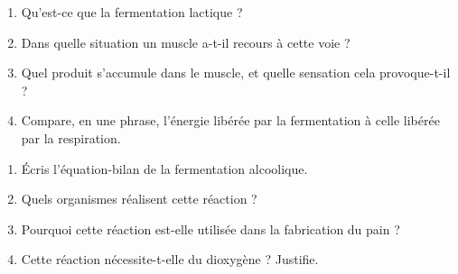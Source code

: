 \begin{enumerate}[label=\arabic*)]
\item Qu'est-ce que la fermentation lactique ?
\item Dans quelle situation un muscle a-t-il recours à cette voie ?
\item Quel produit s'accumule dans le muscle, et quelle sensation cela provoque-t-il ?
\item Compare, en une phrase, l'énergie libérée par la fermentation à celle libérée par
la respiration.
\end{enumerate}

\begin{enumerate}[label=\arabic*)]
\item Écris l'équation-bilan de la fermentation alcoolique.
\item Quels organismes réalisent cette réaction ?
\item Pourquoi cette réaction est-elle utilisée dans la fabrication du pain ?
\item Cette réaction nécessite-t-elle du dioxygène ? Justifie.
\end{enumerate}

